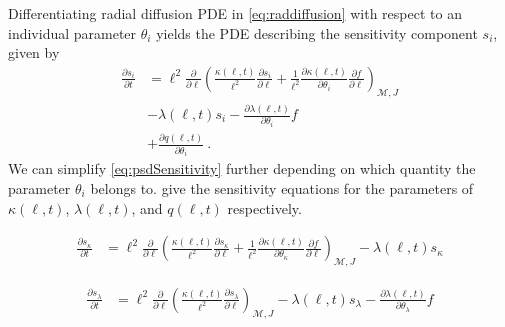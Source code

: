 Differentiating radial diffusion PDE in \cref{eq:raddiffusion} with respect to an individual 
parameter $\theta_i$ yields the PDE describing the sensitivity component $s_i$, given by 
\begin{equation}\label{eq:psdSensitivity}
    \begin{aligned}
        \frac{\partial{s_i}}{\partial{t}} &= \ell^2 \frac{\partial}{\partial{\ell}} \left( 
            \frac{\kappa(\ell, t)}{\ell^{2}} \frac{\partial{s_i}}{\partial{\ell}} +
            \frac{1}{\ell^{2}} \frac{\partial{\kappa(\ell, t)}}{\partial{\theta_i}} 
            \frac{\partial{f}}{\partial{\ell}}
        \right)_{\mathcal{M}, J} \\
         &- \lambda(\ell, t) s_i - \frac{\partial{\lambda}(\ell, t)}{\partial{\theta_i}} f \\
         &+ \frac{\partial{q}(\ell, t)}{\partial{\theta_i}} \ .
    \end{aligned}
\end{equation}
We can simplify \cref{eq:psdSensitivity} further depending on which quantity the parameter 
$\theta_i$ belongs to.  
give the sensitivity equations for the parameters of $\kappa(\ell, t)$, $\lambda(\ell, t)$, and 
$q(\ell, t)$ respectively.

\begin{equation}\label{eq:psdSensitivityDiff}
    \begin{aligned}
        \frac{\partial{s_{\kappa}}}{\partial{t}} &= \ell^2 \frac{\partial}{\partial{\ell}} \left( 
            \frac{\kappa(\ell, t)}{\ell^{2}} \frac{\partial{s_{\kappa}}}{\partial{\ell}} +
            \frac{1}{\ell^{2}} \frac{\partial{\kappa(\ell, t)}}{\partial{\theta_{\kappa}}} 
            \frac{\partial{f}}{\partial{\ell}}
        \right)_{\mathcal{M}, J}
         - \lambda(\ell, t) s_{\kappa}
    \end{aligned}
\end{equation}

\begin{equation}\label{eq:psdSensitivityLambda}
    \begin{aligned}
        \frac{\partial{s_{\lambda}}}{\partial{t}} &= \ell^2 \frac{\partial}{\partial{\ell}} \left( 
            \frac{\kappa(\ell, t)}{\ell^{2}} \frac{\partial{s_{\lambda}}}{\partial{\ell}} 
        \right)_{\mathcal{M}, J}
         - \lambda(\ell, t) s_{\lambda}
         - \frac{\partial\lambda(\ell, t)}{\partial{\theta_{\lambda}}} f
    \end{aligned}
\end{equation}

